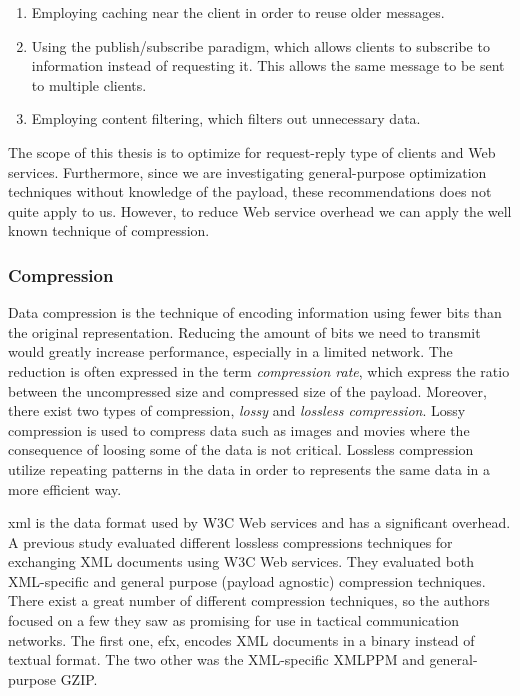 \begin{enumerate}
    \item Employing caching near the client in order to reuse older messages.
    \item Using the publish/subscribe paradigm, which allows clients to subscribe to
    information instead of requesting it. This allows the same message to be sent
    to multiple clients.
    \item Employing content filtering, which filters out unnecessary data.
\end{enumerate}

The scope of this thesis is to optimize for request-reply type of clients
and Web services. Furthermore, since we are investigating general-purpose
optimization techniques without knowledge of the payload, these
recommendations does not quite apply to us. However, to reduce Web service
overhead we can apply the well known technique of compression.

\subsubsection{Compression}

Data compression is the technique of encoding information using fewer bits than
the original representation. Reducing the amount of bits we need to transmit
would greatly increase performance, especially in  a limited network. The
reduction is often expressed in the term \textit{compression rate}, which
express the ratio between the uncompressed size and compressed size of the
payload.  Moreover, there exist two types of compression, \textit{lossy} and
\textit{lossless compression}. Lossy compression is used to compress data such
as images and movies where the consequence of loosing some of the data is not
critical. Lossless compression utilize repeating patterns in the data in order
to represents the same data in a more efficient way.

\gls{xml} is the data format used by W3C Web services and has a significant
overhead. A previous study evaluated different lossless compressions techniques
for exchanging XML documents using W3C Web services\cite{johnsen-compression}.
They evaluated both XML-specific and general purpose (payload agnostic)
compression techniques. There exist a great number of different compression
techniques, so the authors focused on a few they saw as promising for use in
tactical communication networks. The first one, \gls{efx}, encodes XML documents
in a binary instead of textual format. The two other was the XML-specific XMLPPM
and general-purpose GZIP.

